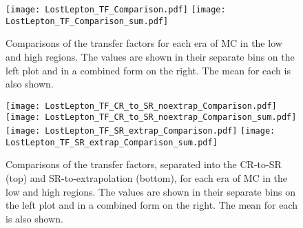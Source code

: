 \begin{figure}
	\begin{center}
  \texttt{[image: LostLepton\_TF\_Comparison.pdf]}
  \texttt{[image: LostLepton\_TF\_Comparison\_sum.pdf]} \\
	\end{center}
	\caption[Transfer Factor Comparison]{Comparisons of the transfer factors for each era of MC in the low and high \dm{} regions. The values are shown in their separate bins on the left plot and in a combined form on the right. The mean for each is also shown. 
	 }
	\label{fig:llb-1lcr-datavsmc-total-tf}
\end{figure}
\begin{figure}
	\begin{center}  
		\texttt{[image: LostLepton\_TF\_CR\_to\_SR\_noextrap\_Comparison.pdf]}
		\texttt{[image: LostLepton\_TF\_CR\_to\_SR\_noextrap\_Comparison\_sum.pdf]} \\
		\texttt{[image: LostLepton\_TF\_SR\_extrap\_Comparison.pdf]}
		\texttt{[image: LostLepton\_TF\_SR\_extrap\_Comparison\_sum.pdf]}
	\end{center}
	\caption[Separated Transfer Factor Comparison]{Comparisons of the transfer factors, separated into the CR-to-SR (top) and SR-to-extrapolation (bottom), for each era of MC in the low and high \dm{} regions. The values are shown in their separate bins on the left plot and in a combined form on the right. The mean for each is also shown. 
	 }
	\label{fig:llb-1lcr-datavsmc-sep-tf}
\end{figure}
